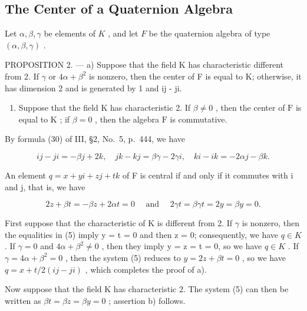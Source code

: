 \subsection{The Center of a Quaternion Algebra}

Let \(\alpha, \beta, \gamma\) be elements of \(K\) , and let \(F\) be the quaternion algebra of type \((\alpha, \beta, \gamma)\) .

PROPOSITION 2. --- a) Suppose that the field K has characteristic different from 2. If \(\gamma\) or \(4\alpha + \beta^{2}\) is nonzero, then the center of F is equal to K; otherwise, it has dimension 2 and is generated by 1 and ij - ji.

\begin{enumerate}
\def\labelenumi{\alph{enumi})}
\setcounter{enumi}{1}
\tightlist
\item
  Suppose that the field \(\mathrm{K}\) has characteristic 2. If \(\beta \neq 0\) , then the center of \(\mathrm{F}\) is equal to \(\mathrm{K}\) ; if \(\beta = 0\) , then the algebra \(\mathrm{F}\) is commutative.
\end{enumerate}

By formula (30) of III, §2, No.~5, p.~444, we have

\[
i j - j i = - \beta j + 2 k, \quad j k - k j = \beta \gamma - 2 \gamma i, \quad k i - i k = - 2 \alpha j - \beta k. \tag {4}
\]

An element \(q = x + yi + zj + tk\) of F is central if and only if it commutes with i and j, that is, we have

\[
2 z + \beta t = - \beta z + 2 \alpha t = 0 \quad \text { and } \quad 2 \gamma t = \beta \gamma t = 2 y = \beta y = 0.\tag{5}
\]

First suppose that the characteristic of K is different from 2. If \(\gamma\) is nonzero, then the equalities in (5) imply y = t = 0 and then z = 0; consequently, we have \(q \in K\) . If \(\gamma = 0\) and \(4\alpha + \beta^{2} \neq 0\) , then they imply y = z = t = 0, so we have \(q \in K\) . If \(\gamma = 4\alpha + \beta^{2} = 0\) , then the system (5) reduces to \(y = 2z + \beta t = 0\) , so we have \(q = x + t/2(ij - ji)\) , which completes the proof of a).

Now suppose that the field K has characteristic 2. The system (5) can then be written as \(\beta t = \beta z = \beta y = 0\) ; assertion b) follows.

